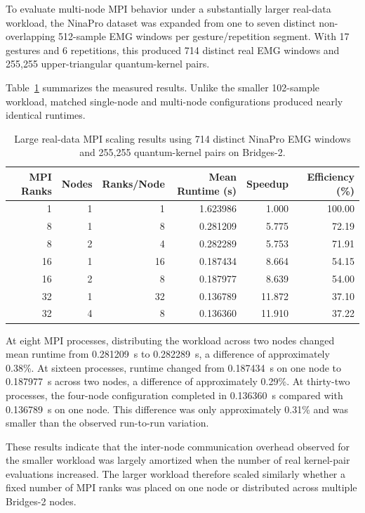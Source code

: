 \documentclass[pdflatex,sn-mathphys-num]{sn-jnl}%
\theoremstyle{thmstyleone}%
\theoremstyle{thmstyletwo}%
\theoremstyle{thmstylethree}%
\begin{document}
To evaluate multi-node MPI behavior under a substantially larger real-data
workload, the NinaPro dataset was expanded from one to seven distinct
non-overlapping 512-sample EMG windows per gesture/repetition segment. With
17 gestures and 6 repetitions, this produced 714 distinct real EMG windows
and 255,255 upper-triangular quantum-kernel pairs.

Table~\ref{tab:realdata-multinode-results} summarizes the measured results.
Unlike the smaller 102-sample workload, matched single-node and multi-node
configurations produced nearly identical runtimes.

\begin{table}[!htbp]
\centering
\caption{Large real-data MPI scaling results using 714 distinct NinaPro EMG
windows and 255,255 quantum-kernel pairs on Bridges-2.}
\label{tab:realdata-multinode-results}

\setlength{\tabcolsep}{4pt}

\begin{tabular}{rrrrrr}
\toprule
MPI Ranks &
Nodes &
Ranks/Node &
Mean Runtime (s) &
Speedup &
Efficiency (\%) \\
\midrule
1  & 1 & 1  & 1.623986 & 1.000  & 100.00 \\
8  & 1 & 8  & 0.281209 & 5.775  & 72.19 \\
8  & 2 & 4  & 0.282289 & 5.753  & 71.91 \\
16 & 1 & 16 & 0.187434 & 8.664  & 54.15 \\
16 & 2 & 8  & 0.187977 & 8.639  & 54.00 \\
32 & 1 & 32 & 0.136789 & 11.872 & 37.10 \\
32 & 4 & 8  & 0.136360 & 11.910 & 37.22 \\
\bottomrule
\end{tabular}
\end{table}

At eight MPI processes, distributing the workload across two nodes changed
mean runtime from 0.281209~s to 0.282289~s, a difference of approximately
0.38\%. At sixteen processes, runtime changed from 0.187434~s on one node
to 0.187977~s across two nodes, a difference of approximately 0.29\%.
At thirty-two processes, the four-node configuration completed in
0.136360~s compared with 0.136789~s on one node. This difference was only
approximately 0.31\% and was smaller than the observed run-to-run variation.

These results indicate that the inter-node communication overhead observed
for the smaller workload was largely amortized when the number of real
kernel-pair evaluations increased. The larger workload therefore scaled
similarly whether a fixed number of MPI ranks was placed on one node or
distributed across multiple Bridges-2 nodes.
\end{document}
